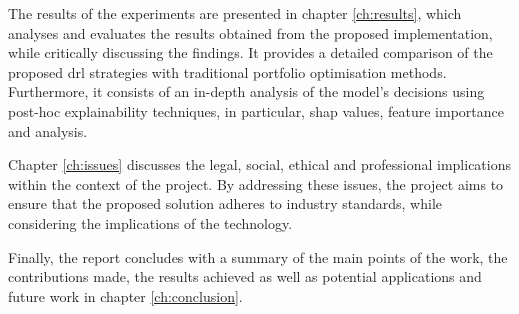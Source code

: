 The results of the experiments are presented in chapter \ref{ch:results}, which analyses and evaluates the results obtained from the proposed implementation, while critically discussing the findings. It provides a detailed comparison of the proposed \acrshort{drl} strategies with traditional portfolio optimisation methods. Furthermore, it consists of an in-depth analysis of the model's decisions using post-hoc explainability techniques, in particular, \acrshort{shap} values, feature importance and  analysis. 

Chapter \ref{ch:issues} discusses the legal, social, ethical and professional implications within the context of the project. By addressing these issues, the project aims to ensure that the proposed solution adheres to industry standards, while considering the implications of the technology.

Finally, the report concludes with a summary of the main points of the work, the contributions made, the results achieved as well as potential applications and future work in chapter \ref{ch:conclusion}.

